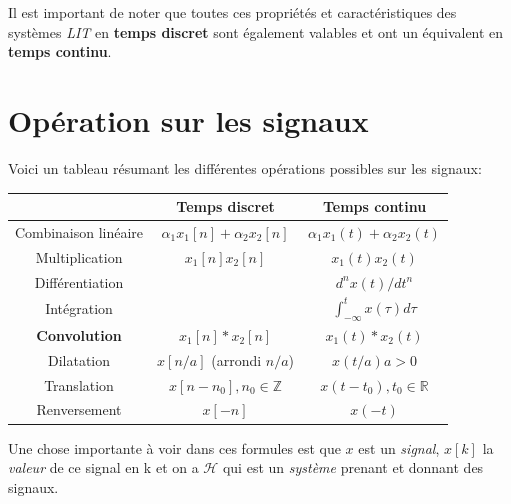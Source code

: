 \documentclass{report}
\begin{document}
Il est important de noter que toutes ces propriétés et caractéristiques des systèmes \textit{LIT} en \textbf{temps discret} sont également valables et ont un équivalent en \textbf{temps continu}.



\section{Opération sur les signaux}
Voici un tableau résumant les différentes opérations possibles sur les signaux:
\begin{center}
\begin{tabular}{|c|c|c|}
	\hline
	 & Temps discret & Temps continu\\
	\hline
	Combinaison linéaire & $\alpha_1 x_1[n] + \alpha_2 x_2[n]$ & $\alpha_1 x_1(t) + \alpha_2 x_2(t)$\\
	\hline
	Multiplication & $x_1[n]x_2[n]$ & $x_1(t)x_2(t)$\\
	\hline
	Différentiation &  & $d^nx(t)/dt^n$\\
	\hline
	Intégration &  & $\int_{-\infty}^t x(\tau)d\tau$\\
	\hline
	\textbf{Convolution} & $x_1[n] \ast x_2[n]$ & $x_1(t) \ast x_2(t)$\\
	\hline
	Dilatation & $x[n/a]$ (arrondi $n/a$) & $x(t/a) a>0$\\
	\hline
	Translation & $x[n-n_0], n_0 \in \mathbb{Z}$ & $x(t-t_0), t_0 \in \mathbb{R}$\\
	\hline
	Renversement & $x[-n]$ & $x(-t)$\\
	\hline
\end{tabular}
\end{center}
Une chose importante à voir dans ces formules est que $x$ est un \textit{signal}, $x[k]$ la \textit{valeur} de ce signal en k et on a $\mathcal{H}$ qui est un \textit{système} prenant et donnant des signaux.
\end{document}
